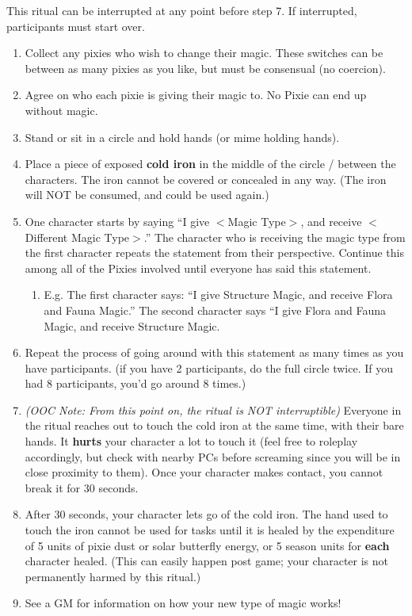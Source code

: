 \documentclass[green]{PP}
\begin{document}
\name{\gSwitch{}}

This ritual can be interrupted at any point before step 7. If interrupted, participants must start over.

\begin{enumerate}
	\item Collect any pixies who wish to change their magic. These switches can be between as many pixies as you like, but must be consensual (no coercion).
	\item Agree on who each pixie is giving their magic to. No Pixie can end up without magic.
	\item Stand or sit in a circle and hold hands (or mime holding hands). 
	\item Place a piece of exposed \textbf{cold iron }in the middle of the circle / between the characters. The iron cannot be covered or concealed in any way. (The iron will NOT be consumed, and could be used again.)
	\item One character starts by saying “I give $<$Magic Type$>$, and receive $<$Different Magic Type$>$.” The character who is receiving the magic type from the first character repeats the statement from their perspective. Continue this among all of the Pixies involved until everyone has said this statement.
	\begin{enumerate}
		\item E.g. The first character says: “I give Structure Magic, and receive Flora and Fauna Magic.” The second character says “I give Flora and Fauna Magic, and receive Structure Magic.
	\end{enumerate}
	\item Repeat the process of going around with this statement as many times as you have participants. (if you have 2 participants, do the full circle twice. If you had 8 participants, you’d go around 8 times.)
	\item \textit{(OOC Note: From this point on, the ritual is NOT interruptible)} Everyone in the ritual reaches out to touch the cold iron at the same time, with their bare hands. It \textbf{hurts} your character a lot to touch it (feel free to roleplay accordingly, but check with nearby PCs before screaming since you will be in close proximity to them). Once your character makes contact, you cannot break it for 30 seconds. 
	\item After 30 seconds, your character lets go of the cold iron. The hand used to touch the iron cannot be used for tasks until it is healed by the expenditure of 5 units of pixie dust or solar butterfly energy, or 5 season units for \textbf{each} character healed. (This can easily happen post game; your character is not permanently harmed by this ritual.)
	\item See a GM for information on how your new type of magic works!
\end{enumerate}
\end{document}
